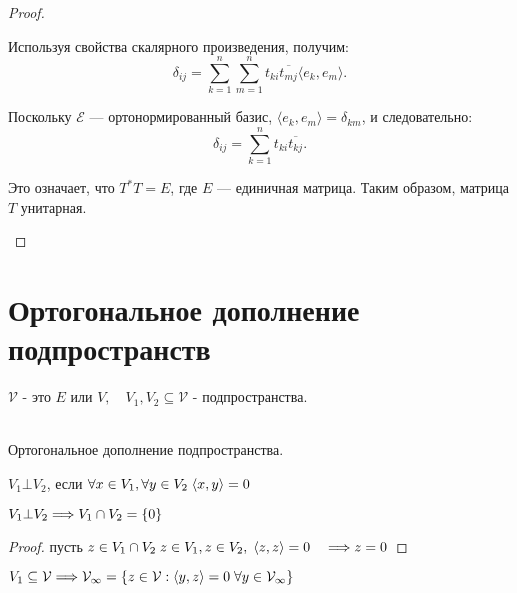 \begin{proof}
\begin{enumerate}
        \quad Используя свойства скалярного произведения, получим:
        \[
        \delta_{ij} = \sum_{k=1}^n \sum_{m=1}^n t_{ki} \overline{t_{mj}} \langle e_k, e_m \rangle.
        \]
        \nl
        
        \quad Поскольку \( \mathcal{E} \) — ортонормированный базис, \( \langle e_k, e_m \rangle = \delta_{km} \), и следовательно:
        \[
        \delta_{ij} = \sum_{k=1}^n t_{ki} \overline{t_{kj}}.
        \]
        \nl
        
        \quad Это означает, что \( T^* T = E \), где \( E \) — единичная матрица. Таким образом, матрица \( T \) унитарная.
    \end{enumerate}

\end{proof}

\clearpage

\section{Ортогональное дополнение подпространств}

$\mathcal{V}$ - это $E$ или $V, \quad V_{1}, V_{2} \subseteq \mathcal{V}$ - подпространства.
        
\begin{shdef}
    \begin{definition}
    \leavevmode \\

        Ортогональное дополнение подпространства. 
        
        $V_{1} \bot V_{2}$, если $\forall x \in V_{1}, \forall y \in V_{2} \; \langle x, y \rangle = 0$
    \end{definition}
\end{shdef}

\begin{shth}
    \begin{theorem}
        $V_{1} \bot V_{2} \Longrightarrow V_{1} \cap V_{2} = \{0\}$
    \end{theorem}
\end{shth}

\begin{proof}
    \leavevmode \nl
    
    пусть $z \in V_{1} \cap V_{2} \; z \in V_{1}, z \in V_{2}, \; \langle z, z \rangle = 0 \quad \Longrightarrow z = 0$
\end{proof}

\begin{shdef}
    \begin{definition}
        $V_{1} \subseteq \mathcal{V} \Longrightarrow \mathcal{V_{1}} = \{ z \in \mathcal{V}: \langle y, z \rangle = 0 \; \forall y \in \mathcal{V_{1}} \}$
    \end{definition}
\end{shdef}

